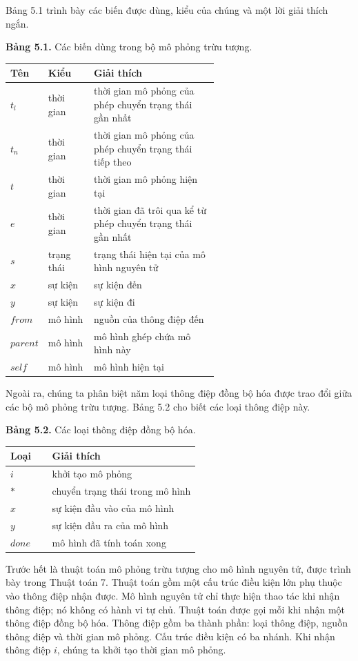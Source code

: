 Bảng 5.1 trình bày các biến được dùng, kiểu của chúng và một lời giải thích ngắn.
\begin{center}
\small\textbf{Bảng 5.1.} Các biến dùng trong bộ mô phỏng trừu tượng.
\begin{tabular}{@{}llp{0.60\linewidth}@{}}
\toprule
Tên&Kiểu&Giải thích\\\midrule
$t_l$&thời gian&thời gian mô phỏng của phép chuyển trạng thái gần nhất\\
$t_n$&thời gian&thời gian mô phỏng của phép chuyển trạng thái tiếp theo\\
$t$&thời gian&thời gian mô phỏng hiện tại\\
$e$&thời gian&thời gian đã trôi qua kể từ phép chuyển trạng thái gần nhất\\
$s$&trạng thái&trạng thái hiện tại của mô hình nguyên tử\\
$x$&sự kiện&sự kiện đến\\
$y$&sự kiện&sự kiện đi\\
$from$&mô hình&nguồn của thông điệp đến\\
$parent$&mô hình&mô hình ghép chứa mô hình này\\
$self$&mô hình&mô hình hiện tại\\\bottomrule
\end{tabular}
\end{center}
Ngoài ra, chúng ta phân biệt năm loại thông điệp đồng bộ hóa được trao đổi giữa các bộ mô phỏng trừu tượng. Bảng 5.2 cho biết các loại thông điệp này.
\begin{center}
\small\textbf{Bảng 5.2.} Các loại thông điệp đồng bộ hóa.
\begin{tabular}{@{}lp{0.78\linewidth}@{}}
\toprule
Loại&Giải thích\\\midrule
$i$&khởi tạo mô phỏng\\
$*$&chuyển trạng thái trong mô hình\\
$x$&sự kiện đầu vào của mô hình\\
$y$&sự kiện đầu ra của mô hình\\
$done$&mô hình đã tính toán xong\\\bottomrule
\end{tabular}
\end{center}
Trước hết là thuật toán mô phỏng trừu tượng cho mô hình nguyên tử, được trình bày trong Thuật toán 7. Thuật toán gồm một cấu trúc điều kiện lớn phụ thuộc vào thông điệp nhận được. Mô hình nguyên tử chỉ thực hiện thao tác khi nhận thông điệp; nó không có hành vi tự chủ. Thuật toán được gọi mỗi khi nhận một thông điệp đồng bộ hóa. Thông điệp gồm ba thành phần: loại thông điệp, nguồn thông điệp và thời gian mô phỏng. Cấu trúc điều kiện có ba nhánh. Khi nhận thông điệp $i$, chúng ta khởi tạo thời gian mô phỏng.

